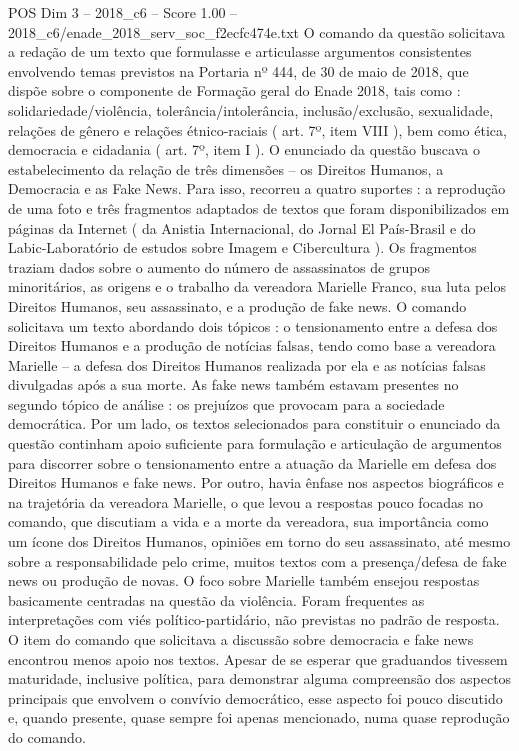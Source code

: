 \begin{textsample}{POS Dim 3 – 2018\_c6 – Score 1.00 – 2018\_c6/enade\_2018\_serv\_soc\_f2ecfc474e.txt}
O comando da questão solicitava a redação de um texto que formulasse e articulasse argumentos consistentes envolvendo temas previstos na Portaria nº 444, de 30 de maio de 2018, que dispõe sobre o componente de Formação geral do Enade 2018, tais como : solidariedade/violência, tolerância/intolerância, inclusão/exclusão, sexualidade, relações de gênero e relações étnico-raciais ( art. 7º, item VIII ), bem como ética, democracia e cidadania ( art. 7º, item I ).
O enunciado da questão buscava o estabelecimento da relação de três dimensões – os Direitos Humanos, a Democracia e as Fake News.
Para isso, recorreu a quatro suportes : a reprodução de uma foto e três fragmentos adaptados de textos que foram disponibilizados em páginas da Internet ( da Anistia Internacional, do Jornal El País-Brasil e do Labic-Laboratório de estudos sobre Imagem e Cibercultura ).
Os fragmentos traziam dados sobre o aumento do número de assassinatos de grupos minoritários, as origens e o trabalho da vereadora Marielle Franco, sua luta pelos Direitos Humanos, seu assassinato, e a produção de fake news.
O comando solicitava um texto abordando dois tópicos : o tensionamento entre a defesa dos Direitos Humanos e a produção de notícias falsas, tendo como base a vereadora Marielle – a defesa dos Direitos Humanos realizada por ela e as notícias falsas divulgadas após a sua morte.
As fake news também estavam presentes no segundo tópico de análise : os prejuízos que provocam para a sociedade democrática.
Por um lado, os textos selecionados para constituir o enunciado da questão continham apoio suficiente para formulação e articulação de argumentos para discorrer sobre o tensionamento entre a atuação da Marielle em defesa dos Direitos Humanos e fake news.
Por outro, havia ênfase nos aspectos biográficos e na trajetória da vereadora Marielle, o que levou a respostas pouco focadas no comando, que discutiam a vida e a morte da vereadora, sua importância como um ícone dos Direitos Humanos, opiniões em torno do seu assassinato, até mesmo sobre a responsabilidade pelo crime, muitos textos com a presença/defesa de fake news ou produção de novas.
O foco sobre Marielle também ensejou respostas basicamente centradas na questão da violência.
Foram frequentes as interpretações com viés político-partidário, não previstas no padrão de resposta.
O item do comando que solicitava a discussão sobre democracia e fake news encontrou menos apoio nos textos.
Apesar de se esperar que graduandos tivessem maturidade, inclusive política, para demonstrar alguma compreensão dos aspectos principais que envolvem o convívio democrático, esse aspecto foi pouco discutido e, quando presente, quase sempre foi apenas mencionado, numa quase reprodução do comando.

\end{textsample}
